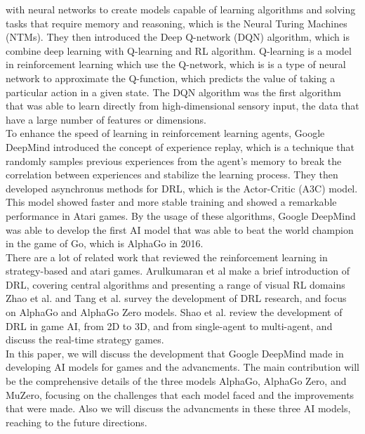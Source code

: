 with neural networks to create models capable of learning algorithms and
solving tasks that require memory and reasoning, which is the Neural Turing
Machines (NTMs)\cite{I4}. They then introduced the Deep Q-network (DQN)
algorithm, which is combine deep learning with Q-learning and RL algorithm.
Q-learning is a model in reinforcement learning which use the Q-network, which
is is a type of neural network to approximate the Q-function, which predicts
the value of taking a particular action in a given state\cite{I5}. The DQN
algorithm was the first algorithm that was able to learn directly from
high-dimensional sensory input, the data that have a large number of features
or dimensions\cite{I6}.\\ To enhance the speed of learning in reinforcement
learning agents, Google DeepMind introduced the concept of experience replay,
which is a technique that randomly samples previous experiences from the
agent's memory to break the correlation between experiences and stabilize the
learning process\cite{I7}. They then developed asynchronus methods for DRL,
which is the Actor-Critic (A3C) model. This model showed faster and more stable
training and showed a remarkable performance in Atari games\cite{I8}. By the
usage of these algorithms, Google DeepMind was able to develop the first AI
model that was able to beat the world champion in the game of Go, which is
AlphaGo in 2016.\\ There are a lot of related work that reviewed the
reinforcement learning in strategy-based and atari games. Arulkumaran et
al\cite{I9} make a brief introduction of DRL, covering central algorithms and
presenting a range of visual RL domains Zhao et al.\cite{I10} and Tang et
al.\cite{I11} survey the development of DRL research, and focus on AlphaGo and
AlphaGo Zero models. Shao et al.\cite{I12} review the development of DRL in
game AI, from 2D to 3D, and from single-agent to multi-agent, and discuss the
real-time strategy games.\\ In this paper, we will discuss the development that
Google DeepMind made in developing AI models for games and the advancments. The
main contribution will be the comprehensive details of the three models
AlphaGo, AlphaGo Zero, and MuZero, focusing on the challenges that each model
faced and the improvements that were made. Also we will discuss the advancments
in these three AI models, reaching to the future directions.